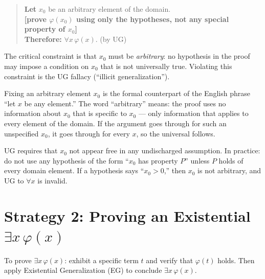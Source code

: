 \begin{quote}
\textbf{Let} $x_0$ be an arbitrary element of the domain.\\
\textbf{[prove $\varphi(x_0)$ using only the hypotheses, not any special property of $x_0$]}\\
\textbf{Therefore:} $\forall x\,\varphi(x)$. \quad (by UG)
\end{quote}

\begin{exposition}
The critical constraint is that $x_0$ must be \emph{arbitrary}: no hypothesis
in the proof may impose a condition on $x_0$ that is not universally true.
Violating this constraint is the UG fallacy (``illicit generalization'').
\end{exposition}

\begin{remark*}
Fixing an arbitrary element $x_0$ is the formal counterpart of the English
phrase ``let $x$ be any element.'' The word ``arbitrary'' means: the proof
uses no information about $x_0$ that is specific to $x_0$ --- only information
that applies to every element of the domain. If the argument goes through for
such an unspecified $x_0$, it goes through for every $x$, so the universal
follows.
\end{remark*}

\begin{remark*}
UG requires that $x_0$ not appear free in any undischarged assumption. In
practice: do not use any hypothesis of the form ``$x_0$ has property $P$''
unless $P$ holds of every domain element. If a hypothesis says ``$x_0 > 0$,''
then $x_0$ is not arbitrary, and UG to $\forall x$ is invalid.
\end{remark*}


\section*{\texorpdfstring{Strategy 2: Proving an Existential $\exists x\,\varphi(x)$}{Strategy 2: Proving an Existential exists x phi(x)}}

\begin{exposition}
To prove $\exists x\,\varphi(x)$: exhibit a specific term $t$ and verify that
$\varphi(t)$ holds. Then apply Existential Generalization (EG) to conclude
$\exists x\,\varphi(x)$.
\end{exposition}

